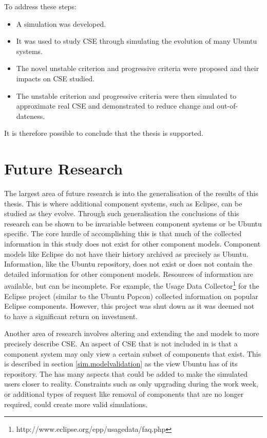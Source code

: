 To address these steps:
\begin{itemize}
  \item A simulation was developed.
  \item It was used to study CSE through simulating the evolution of many Ubuntu systems.
  \item The novel unstable criterion and progressive criteria were proposed and their impacts on CSE studied.
  \item The unstable criterion and progressive criteria were then simulated to approximate real CSE
  and demonstrated to reduce change and out-of-dateness.
\end{itemize}  

It is therefore possible to conclude that the thesis is supported.
 
\section{Future Research}
\label{conclusion.futurework}
The largest area of future research is into the generalisation of the results of this thesis.
This is where additional component systems, such as Eclipse, can be studied as they evolve. 
Through such generalisation the conclusions of this research can be shown to be invariable between component systems or be Ubuntu specific.
The core hurdle of accomplishing this is that much of the collected information in this study does not exist for other component models.
Component models like Eclipse do not have their history archived as precisely as Ubuntu.
Information, like the Ubuntu repository, does not exist or does not contain the detailed information for other component models.
Resources of information are available, but can be incomplete.
For example, the Usage Data Collector\footnote{http://www.eclipse.org/epp/usagedata/faq.php} for the Eclipse project (similar to the Ubuntu Popcon) collected information on popular Eclipse components. 
However, this project was shut down as it was deemed not to have a significant return on investment. 
 
Another area of research involves altering and extending the \modelname and \usermodel models to more precisely describe CSE.
An aspect of CSE that is not included in \modelname is that a component system may only view a certain subset of components that exist.
This is described in section \ref{sim.modelvalidation} as the view Ubuntu has of its repository.
The \usermodel has many aspects that could be added to make the simulated users closer to reality.
Constraints such as only upgrading during the work week, 
or additional types of request like removal of components that are no longer required, could create more valid simulations.

